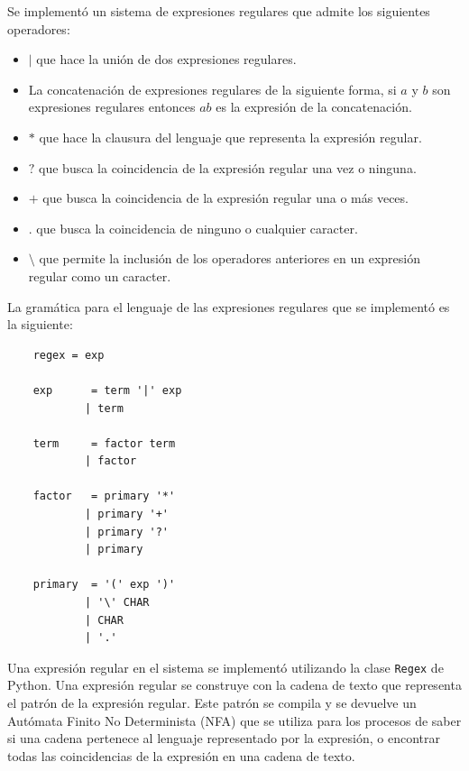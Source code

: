 Se implementó un sistema de expresiones regulares que admite los siguientes operadores:

\begin{itemize}
    \item $|$ que hace la unión de dos expresiones regulares.
    \item La concatenación de expresiones regulares de la siguiente forma, si $a$ y $b$ son expresiones regulares entonces $ab$ es la expresión de la concatenación.
    \item $*$ que hace la clausura del lenguaje que representa la expresión regular.
    \item $?$ que busca la coincidencia de la expresión regular una vez o ninguna.
    \item $+$ que busca la coincidencia de la expresión regular una o más veces.
    \item $.$ que busca la coincidencia de ninguno o cualquier caracter.
    \item $\setminus$  que permite la inclusión de los operadores anteriores en un expresión regular como un caracter.
\end{itemize}

La gramática para el lenguaje de las expresiones regulares que se implementó es la siguiente:

\begin{verbatim}
    regex = exp 

    exp      = term '|' exp    
            | term

    term     = factor term       
            | factor

    factor   = primary '*'      
            | primary '+'       
            | primary '?'       
            | primary

    primary  = '(' exp ')'
            | '\' CHAR              
            | CHAR
            | '.'
\end{verbatim}

Una expresión regular en el sistema se implementó utilizando la clase \verb|Regex| de Python. Una expresión regular se construye con la cadena de texto que representa el patrón de la expresión regular. Este patrón se compila y se devuelve un Autómata Finito No Determinista (NFA) que se utiliza para los procesos de saber si una cadena pertenece al lenguaje representado por la expresión, o encontrar todas las coincidencias de la expresión en una cadena de texto. 

